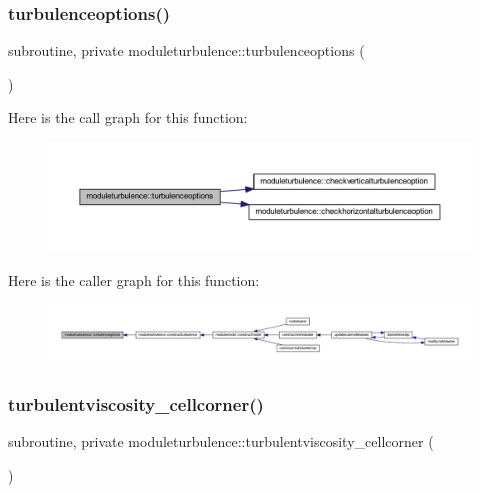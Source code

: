 \subsubsection{\texorpdfstring{turbulenceoptions()}{turbulenceoptions()}}
{\footnotesize\ttfamily subroutine, private moduleturbulence\+::turbulenceoptions (\begin{DoxyParamCaption}{ }\end{DoxyParamCaption})\hspace{0.3cm}{\ttfamily [private]}}

Here is the call graph for this function\+:\nopagebreak
\begin{figure}[H]
\begin{center}
\leavevmode
\includegraphics[width=350pt]{namespacemoduleturbulence_ad051a97467f11a69e59b2a477e516ba9_cgraph}
\end{center}
\end{figure}
Here is the caller graph for this function\+:\nopagebreak
\begin{figure}[H]
\begin{center}
\leavevmode
\includegraphics[width=350pt]{namespacemoduleturbulence_ad051a97467f11a69e59b2a477e516ba9_icgraph}
\end{center}
\end{figure}
\mbox{\label{namespacemoduleturbulence_ab7894e5b2120544a23a97a5dec146823}} 
\subsubsection{\texorpdfstring{turbulentviscosity\+\_\+cellcorner()}{turbulentviscosity\_cellcorner()}}
{\footnotesize\ttfamily subroutine, private moduleturbulence\+::turbulentviscosity\+\_\+cellcorner (\begin{DoxyParamCaption}{ }\end{DoxyParamCaption})\hspace{0.3cm}{\ttfamily [private]}}

